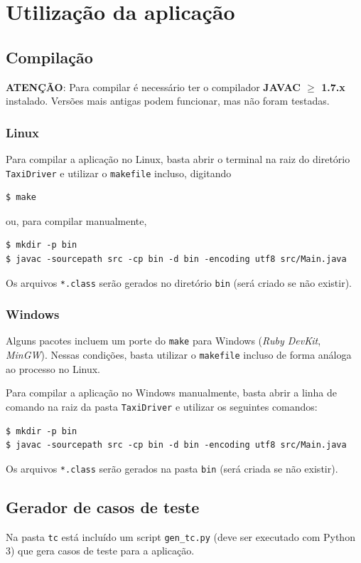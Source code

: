 \documentclass[a4paper,landscape,12pt]{article}
\begin{document}
\newpage
\section{Utilização da aplicação}

\subsection{Compilação}
\textbf{ATENÇÃO}: Para compilar é necessário ter o compilador \textbf{JAVAC $\geq$ 1.7.x} instalado. Versões mais antigas podem funcionar, mas não foram testadas. 

\subsubsection*{Linux}
Para compilar a aplicação no Linux, basta abrir o terminal na raiz do diretório \texttt{TaxiDriver} e utilizar o \texttt{makefile} incluso, digitando
\begin{verbatim}
$ make
\end{verbatim}
ou, para compilar manualmente,
\begin{verbatim}
$ mkdir -p bin
$ javac -sourcepath src -cp bin -d bin -encoding utf8 src/Main.java
\end{verbatim}
Os arquivos \texttt{*.class} serão gerados no diretório \texttt{bin} (será criado se não existir).

\subsubsection*{Windows}
Alguns pacotes incluem um porte do \texttt{make} para Windows (\textit{Ruby DevKit}, \textit{MinGW}). Nessas condições, basta utilizar o \texttt{makefile} incluso de forma análoga ao processo no Linux.

Para compilar a aplicação no Windows manualmente, basta abrir a linha de comando na raiz da pasta \texttt{TaxiDriver} e utilizar os seguintes comandos:
\begin{verbatim}
$ mkdir -p bin
$ javac -sourcepath src -cp bin -d bin -encoding utf8 src/Main.java
\end{verbatim}
Os arquivos \texttt{*.class} serão gerados na pasta \texttt{bin} (será criada se não existir).

\subsection{Gerador de casos de teste}
Na pasta \texttt{tc} está incluído um script \texttt{gen\_tc.py} (deve ser executado com Py\-thon 3) que gera casos de teste para a aplicação.
\end{document}

